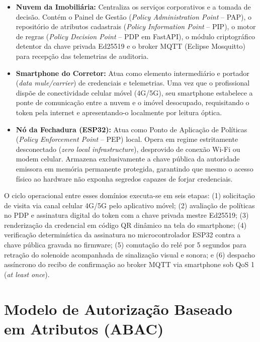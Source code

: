 \begin{itemize}
    \item \textbf{Nuvem da Imobiliária:} Centraliza os serviços corporativos e a tomada de decisão. Contém o Painel de Gestão (\textit{Policy Administration Point} -- PAP), o repositório de atributos cadastrais (\textit{Policy Information Point} -- PIP), o motor de regras (\textit{Policy Decision Point} -- PDP em FastAPI), o módulo criptográfico detentor da chave privada Ed25519 e o broker MQTT (Eclipse Mosquitto) para recepção das telemetrias de auditoria.
    \item \textbf{Smartphone do Corretor:} Atua como elemento intermediário e portador (\textit{data mule/carrier}) de credenciais e telemetrias. Uma vez que o profissional dispõe de conectividade celular móvel (4G/5G), seu smartphone estabelece a ponte de comunicação entre a nuvem e o imóvel desocupado, requisitando o token pela internet e apresentando-o localmente por leitura óptica.
    \item \textbf{Nó da Fechadura (ESP32):} Atua como Ponto de Aplicação de Políticas (\textit{Policy Enforcement Point} -- PEP) local. Opera em regime estritamente desconectado (\textit{zero local infrastructure}), desprovido de conexão Wi-Fi ou modem celular. Armazena exclusivamente a chave pública da autoridade emissora em memória permanente protegida, garantindo que mesmo o acesso físico ao hardware não exponha segredos capazes de forjar credenciais.
\end{itemize}

O ciclo operacional entre esses domínios executa-se em seis etapas: (1) solicitação de visita via canal celular 4G/5G pelo aplicativo móvel; (2) avaliação de políticas no PDP e assinatura digital do token com a chave privada mestre Ed25519; (3) renderização da credencial em código QR dinâmico na tela do smartphone; (4) verificação determinística da assinatura no microcontrolador ESP32 contra a chave pública gravada no firmware; (5) comutação do relé por 5 segundos para retração do solenoide acompanhada de sinalização visual e sonora; e (6) despacho assíncrono do recibo de confirmação ao broker MQTT via smartphone sob QoS 1 (\textit{at least once}).

\section{Modelo de Autorização Baseado em Atributos (ABAC)}
\label{sec:modelo-abac}

